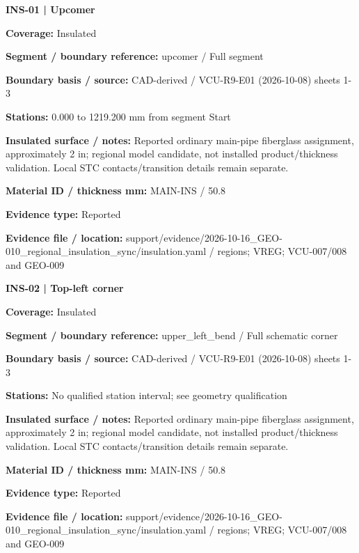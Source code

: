 \documentclass[11pt]{article}
\begin{document}
\par\noindent\begin{minipage}{\textwidth}\small\setlength{\parskip}{2pt}
{\bfseries INS-01 | Upcomer}\par
\textbf{Coverage:} Insulated\par
\textbf{Segment / boundary reference:} upcomer / Full segment\par
\textbf{Boundary basis / source:} CAD-derived / VCU-R9-E01 (2026-10-08) sheets 1-3\par
\textbf{Stations:} 0.000 to 1219.200 mm from segment Start\par
\textbf{Insulated surface / notes:} Reported ordinary main-pipe fiberglass assignment, approximately 2 in; regional model candidate, not installed product/thickness validation. Local STC contacts/transition details remain separate.\par
\textbf{Material ID / thickness mm:} MAIN-INS / 50.8\par
\textbf{Evidence type:} Reported\par
\textbf{Evidence file / location:} support/evidence/2026-10-16\_\allowbreak{}GEO-010\_\allowbreak{}regional\_\allowbreak{}insulation\_\allowbreak{}sync/insulation.yaml / regions; VREG; VCU-007/008 and GEO-009\par
\end{minipage}\par\vspace{5pt}
\par\noindent\begin{minipage}{\textwidth}\small\setlength{\parskip}{2pt}
{\bfseries INS-02 | Top-left corner}\par
\textbf{Coverage:} Insulated\par
\textbf{Segment / boundary reference:} upper\_\allowbreak{}left\_\allowbreak{}bend / Full schematic corner\par
\textbf{Boundary basis / source:} CAD-derived / VCU-R9-E01 (2026-10-08) sheets 1-3\par
\textbf{Stations:} No qualified station interval; see geometry qualification\par
\textbf{Insulated surface / notes:} Reported ordinary main-pipe fiberglass assignment, approximately 2 in; regional model candidate, not installed product/thickness validation. Local STC contacts/transition details remain separate.\par
\textbf{Material ID / thickness mm:} MAIN-INS / 50.8\par
\textbf{Evidence type:} Reported\par
\textbf{Evidence file / location:} support/evidence/2026-10-16\_\allowbreak{}GEO-010\_\allowbreak{}regional\_\allowbreak{}insulation\_\allowbreak{}sync/insulation.yaml / regions; VREG; VCU-007/008 and GEO-009\par
\end{minipage}\par\vspace{5pt}
\end{document}
